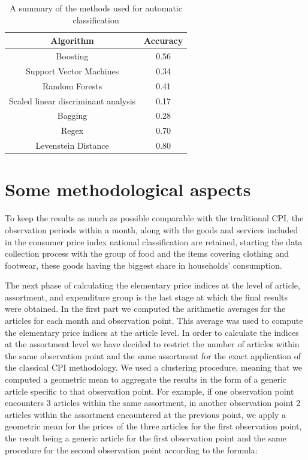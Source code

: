 \documentclass[]{article}
\begin{document}
\begin{table}[h!]
\centering
\begin{tabular}{| c| c| }
	\hline
	Algorithm & Accuracy \\
	\hline  
	Boosting & 0.56 \\  
	Support Vector Machines & 0.34 \\
	Random Forests &  0.41 \\
	Scaled linear discriminant analysis & 0.17 \\
	Bagging & 0.28 \\
	Regex & 0.70 \\
	Levenstein Distance & 0.80 \\
	\hline
\end{tabular}
\caption{A summary of the methods used for automatic classification}
\label{table:1}
\end{table}

\section{Some methodological aspects}\label{methodology}

To keep the results as much as possible comparable with the traditional CPI, the observation periods within a month, 
along with the goods and services included in the consumer price index national classification are retained, starting 
the data collection process with the group of food and the items covering clothing and footwear, these goods 
having the biggest share in households’ consumption. 


The next phase of calculating the elementary price indices at the level of article, assortment, and expenditure group 
is the last stage at which the final results were obtained. In the first part we computed the arithmetic 
averages for the articles for each month and observation point. This average was used to compute the elementary 
price indices at the article level. In order to calculate the indices at the assortment level we have decided to 
restrict the number of articles within the same observation point and the same assortment for the exact application 
of the classical CPI methodology. We used a clustering procedure, meaning that we computed a geometric mean to 
aggregate the results in the form of a generic article specific to that observation point. For example, if one 
observation point encounters 3 articles within the same assortment, in another observation point 2 articles 
within the assortment encountered at the previous point, we apply a geometric mean for the prices of the three 
articles for the first observation point, the result being a generic article for the first observation point and the 
same procedure for the second observation point according to the formula:
\end{document}
